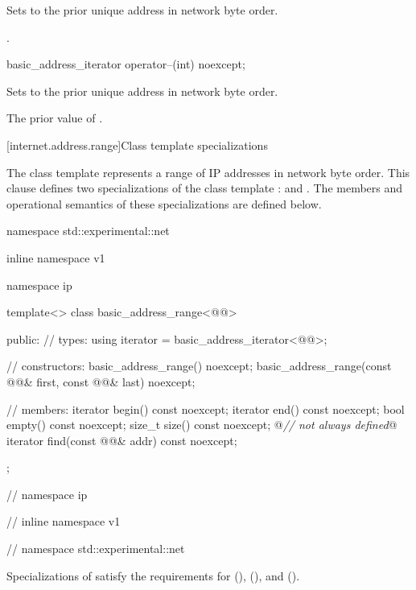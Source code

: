 \begin{itemdescr}
\pnum
\effects Sets  to the prior unique address in network byte order.

\pnum
\returns {}.
\end{itemdescr}

\begin{itemdecl}
basic_address_iterator operator--(int) noexcept;
\end{itemdecl}

\begin{itemdescr}
\pnum
\effects Sets  to the prior unique address in network byte order.

\pnum
\returns The prior value of .
\end{itemdescr}



%
[internet.address.range]{Class template  specializations}

\pnum
The class template  represents a range of IP addresses in network byte order. This clause defines two specializations of the class template :  and . The members and operational semantics of these specializations are defined below.

\begin{codeblock}
namespace std::experimental::net {
inline namespace v1 {
namespace ip {

  template<> class basic_address_range<@@>
  {
  public:
    // types:
    using iterator = basic_address_iterator<@@>;

    // constructors:
    basic_address_range() noexcept;
    basic_address_range(const @@& first,
                        const @@& last) noexcept;

    // members:
    iterator begin() const noexcept;
    iterator end() const noexcept;
    bool empty() const noexcept;
    size_t size() const noexcept; @\textit{// not always defined}@
    iterator find(const @@& addr) const noexcept;
  };

} // namespace ip
} // inline namespace v1
} // namespace std::experimental::net
\end{codeblock}

\pnum
Specializations of  satisfy the requirements for  (),  (), and  ().

